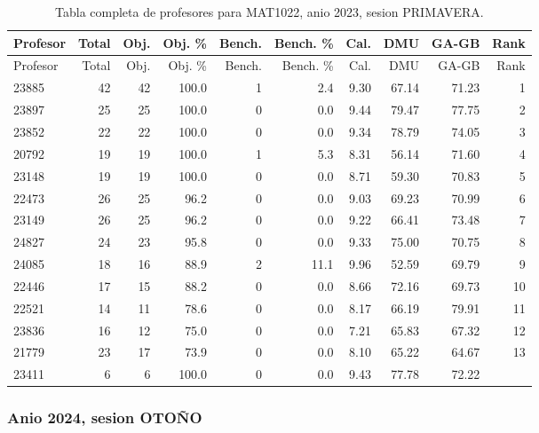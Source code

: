 \begingroup
\scriptsize
\setlength{\tabcolsep}{3pt}
\begin{longtable}{lrrrrrrrrr}
\caption{Tabla completa de profesores para MAT1022, anio 2023, sesion PRIMAVERA.}\label{tab:prof-period-mat1022-2023-primavera}\\
\toprule
Profesor & Total & Obj. & Obj. \% & Bench. & Bench. \% & Cal. & DMU & GA-GB & Rank \\
\midrule
\endfirsthead
\toprule
Profesor & Total & Obj. & Obj. \% & Bench. & Bench. \% & Cal. & DMU & GA-GB & Rank \\
\midrule
\endhead
23885 & 42 & 42 & 100.0 & 1 & 2.4 & 9.30 & 67.14 & 71.23 & 1 \\
23897 & 25 & 25 & 100.0 & 0 & 0.0 & 9.44 & 79.47 & 77.75 & 2 \\
23852 & 22 & 22 & 100.0 & 0 & 0.0 & 9.34 & 78.79 & 74.05 & 3 \\
20792 & 19 & 19 & 100.0 & 1 & 5.3 & 8.31 & 56.14 & 71.60 & 4 \\
23148 & 19 & 19 & 100.0 & 0 & 0.0 & 8.71 & 59.30 & 70.83 & 5 \\
22473 & 26 & 25 & 96.2 & 0 & 0.0 & 9.03 & 69.23 & 70.99 & 6 \\
23149 & 26 & 25 & 96.2 & 0 & 0.0 & 9.22 & 66.41 & 73.48 & 7 \\
24827 & 24 & 23 & 95.8 & 0 & 0.0 & 9.33 & 75.00 & 70.75 & 8 \\
24085 & 18 & 16 & 88.9 & 2 & 11.1 & 9.96 & 52.59 & 69.79 & 9 \\
22446 & 17 & 15 & 88.2 & 0 & 0.0 & 8.66 & 72.16 & 69.73 & 10 \\
22521 & 14 & 11 & 78.6 & 0 & 0.0 & 8.17 & 66.19 & 79.91 & 11 \\
23836 & 16 & 12 & 75.0 & 0 & 0.0 & 7.21 & 65.83 & 67.32 & 12 \\
21779 & 23 & 17 & 73.9 & 0 & 0.0 & 8.10 & 65.22 & 64.67 & 13 \\
23411 & 6 & 6 & 100.0 & 0 & 0.0 & 9.43 & 77.78 & 72.22 &  \\
\bottomrule
\end{longtable}
\endgroup

\subsubsection{Anio 2024, sesion OTOÑO}

